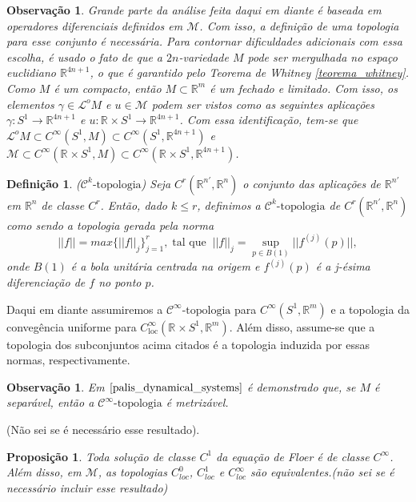 \documentclass[12pt]{book}
\newtheorem{definicao}[teorema]{Definição}
\newtheorem{observacao}[teorema]{Observação}
\newtheorem{proposicao}[teorema]{Proposição}
\newcommand{\aplicaoessuaves}[2]{C^{\infty}(#1, #2)}
\newcommand{\aplicaoessuavesloc}[2]{C^{\infty}_{\text{loc}}(#1, #2)}
\newcommand{\circulo}{S^{1}}
\newcommand{\cktopologia}[1]{\mathcal{C}^{#1}\text{-topologia}}
\newcommand{\energiafinitaM}{\mathcal{M}}
\newcommand{\norma}[1]{||#1||}
\newcommand{\retacartesianocirculo}{\real{} \times \circulo}
\newcommand{\real}[1]{\mathbb{R}^{#1}}
\newcommand{\lacocontrateis}{\mathcal{L}^{o}M}
\newcommand{\alerta}[1]{{\color{red}#1}}
\begin{document}
	\begin{observacao}\label{observacao_mergulho_variedade}
		Grande parte da análise feita daqui em diante é baseada em operadores diferenciais definidos em $\energiafinitaM$. Com isso, a definição de uma topologia para esse conjunto é necessária. Para contornar dificuldades adicionais com essa escolha, é usado o fato de que a $2n$-variedade $M$ pode ser mergulhada no espaço euclidiano $\real{4n+1}$, o que é garantido pelo Teorema de Whitney \ref{teorema_whitney}. Como $M$ é um compacto, então $M \subset\real{m}$ é um fechado e limitado. Com isso, os elementos $\gamma\in \lacocontrateis$ e $u\in \energiafinitaM$ podem ser vistos como as seguintes aplicações $\gamma:\circulo \to \real{4n+1}$ e $u:\retacartesianocirculo \to \real{4n+1}$. Com essa identificação, tem-se que $\lacocontrateis\subset \aplicaoessuaves{\circulo}{M}\subset \aplicaoessuaves{\circulo}{\real{4n+1}}$ e $\energiafinitaM \subset \aplicaoessuaves{\retacartesianocirculo}{M}\subset \aplicaoessuaves{\retacartesianocirculo}{\real{4n+1}}$. 
	\end{observacao}
	
	\begin{definicao}
		($\cktopologia{k}$) Seja $C^{r}(\real{n'}, \real{n})$ o conjunto das aplicações de $\real{n'}$ em $\real{n}$ de classe $C^{r}$. Então, dado $k\leq r$, definimos a $\cktopologia{k}$ de $C^{r}(\real{n'}, \real{n})$ como sendo a topologia gerada pela norma
		$$
		\norma{f} = max \{\norma{f}_{j}\}_{j=1}^{r},\; \text{tal que} \;\; \norma{f}_{j} = \sup_{p \in B(1)}\norma{f^{(j)}(p)},
		$$
		onde $B(1)$ é a bola unitária centrada na origem e $f^{(j)}(p)$ é a j-ésima diferenciação de $f$ no ponto $p$.
	\end{definicao}
	
	Daqui em diante assumiremos a $\cktopologia{\infty}$ para $\aplicaoessuaves{\circulo}{\real{m}}$ e a topologia da convegência uniforme para $\aplicaoessuavesloc{\retacartesianocirculo}{\real{m}}$. Além disso, assume-se que a topologia dos subconjuntos acima citados é a topologia induzida por essas normas, respectivamente.
	
	\alerta{\begin{observacao}
			Em $\cite{palis_dynamical_systems}$ é demonstrado que, se $M$ é separável, então a $\cktopologia{\infty}$ é metrizável.
		\end{observacao}(Não sei se é necessário esse resultado).}
	
	\alerta{
		\begin{proposicao}
			Toda solução de classe $C^{1}$ da equação de Floer é de classe $C^{\infty}$. Além disso, em $\energiafinitaM$, as topologias $C^{0}_{loc}$, $C^{1}_{loc}$ e $C^{\infty}_{loc}$ são equivalentes.(não sei se é necessário incluir esse resultado)
		\end{proposicao}
	}
	
\end{document}
